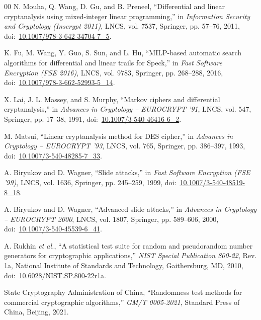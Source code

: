 \documentclass[review,12pt]{elsarticle}
\begin{document}
\begin{thebibliography}{00}
N. Mouha, Q. Wang, D. Gu, and B. Preneel, ``Differential and linear cryptanalysis using mixed-integer linear programming,'' in \textit{Information Security and Cryptology (Inscrypt 2011)}, LNCS, vol. 7537, Springer, pp. 57--76, 2011, doi:~\href{https://doi.org/10.1007/978-3-642-34704-7_5}{10.1007/978-3-642-34704-7\_5}.

K. Fu, M. Wang, Y. Guo, S. Sun, and L. Hu, ``MILP-based automatic search algorithms for differential and linear trails for Speck,'' in \textit{Fast Software Encryption (FSE 2016)}, LNCS, vol. 9783, Springer, pp. 268--288, 2016, doi:~\href{https://doi.org/10.1007/978-3-662-52993-5_14}{10.1007/978-3-662-52993-5\_14}.

X. Lai, J. L. Massey, and S. Murphy, ``Markov ciphers and differential cryptanalysis,'' in \textit{Advances in Cryptology -- EUROCRYPT '91}, LNCS, vol. 547, Springer, pp. 17--38, 1991, doi:~\href{https://doi.org/10.1007/3-540-46416-6_2}{10.1007/3-540-46416-6\_2}.

M. Matsui, ``Linear cryptanalysis method for DES cipher,'' in \textit{Advances in Cryptology -- EUROCRYPT '93}, LNCS, vol. 765, Springer, pp. 386--397, 1993, doi:~\href{https://doi.org/10.1007/3-540-48285-7_33}{10.1007/3-540-48285-7\_33}.

A. Biryukov and D. Wagner, ``Slide attacks,'' in \textit{Fast Software Encryption (FSE '99)}, LNCS, vol. 1636, Springer, pp. 245--259, 1999, doi:~\href{https://doi.org/10.1007/3-540-48519-8_18}{10.1007/3-540-48519-8\_18}.

A. Biryukov and D. Wagner, ``Advanced slide attacks,'' in \textit{Advances in Cryptology -- EUROCRYPT 2000}, LNCS, vol. 1807, Springer, pp. 589--606, 2000, doi:~\href{https://doi.org/10.1007/3-540-45539-6_41}{10.1007/3-540-45539-6\_41}.

A. Rukhin \textit{et al.}, ``A statistical test suite for random and pseudorandom number generators for cryptographic applications,'' \textit{NIST Special Publication 800-22}, Rev. 1a, National Institute of Standards and Technology, Gaithersburg, MD, 2010, doi:~\href{https://doi.org/10.6028/NIST.SP.800-22r1a}{10.6028/NIST.SP.800-22r1a}.

State Cryptography Administration of China, ``Randomness test methods for commercial cryptographic algorithms,'' \textit{GM/T 0005-2021}, Standard Press of China, Beijing, 2021.


\end{thebibliography}
\end{document}
